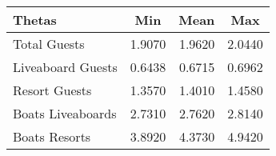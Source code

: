 %
\begin{table}[!tbp]
\begin{center}
\begin{tabular}{lrrr}
\hline\hline
\multicolumn{1}{l}{Thetas}&\multicolumn{1}{c}{Min}&\multicolumn{1}{c}{Mean}&\multicolumn{1}{c}{Max}\tabularnewline
\hline
Total Guests&1.9070&1.9620&2.0440\tabularnewline
Liveaboard Guests&0.6438&0.6715&0.6962\tabularnewline
Resort Guests&1.3570&1.4010&1.4580\tabularnewline
Boats Liveaboards&2.7310&2.7620&2.8140\tabularnewline
Boats Resorts&3.8920&4.3730&4.9420\tabularnewline
\hline
\end{tabular}
\end{center}
\end{table}

